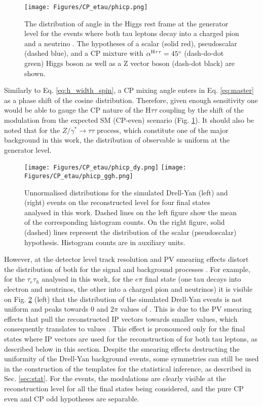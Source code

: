 \begin{figure}[t!]
    \centering
    \texttt{[image: Figures/CP\_etau/phicp.png]}
    \caption{The distribution of \phicp angle in the Higgs rest frame at the generator level for the \htt events where both tau leptons decay into a charged pion and a neutrino \cite{CMS:2021sdq}. The hypotheses of a scalar (solid red), pseudoscalar (dashed blue), and a CP mixture with $\alpha^{\text{H}\tau\tau}=45^\circ$ (dash-do-dot green) Higgs boson as well as a Z vector boson (dash-dot black) are shown.}
    \label{fig:phicp}
\end{figure}

Similarly to Eq. \ref{eq:h_width_spin}, a CP mixing angle \mixa enters in Eq. \ref{eq:master} as a phase shift of the cosine distribution. Therefore, given enough sensitivity one would be able to gauge the CP nature of the $\text{H}\tau\tau$ coupling by the shift of the modulation from the expected SM (CP-even) scenario (Fig. \ref{fig:phicp}). It should also be noted that for the $Z/\gamma^* \to \tau\tau$ process, which constitute one of the major background in this work, the distribution of \phicp observable is uniform at the generator level. 

\begin{figure}[t!]
    \centering
    \texttt{[image: Figures/CP\_etau/phicp\_dy.png]}
    \texttt{[image: Figures/CP\_etau/phicp\_ggh.png]}
    \caption{Unnormalised \phicp distributions for the simulated Drell-Yan (left) and \htt (right) events on the reconstructed level for four final states analysed in this work. Dashed lines on the left figure show the mean of the corresponding histogram counts. On the right figure, solid (dashed) lines represent the distribution of the scalar (pseudoscalar) \htt hypothesis. Histogram counts are in auxiliary units.}
    \label{fig:phicp_e}
\end{figure}

However, at the detector level track resolution and PV smearing effects distort the distribution of \phicp both for the signal and background processes \cite{Berge:2014sra}. For example, for the $\tau_e\tau_h$ analysed in this work, for the $e\pi$ final state (one tau decays into electron and neutrinos, the other into a charged pion and neutrinos) it is visible on Fig. \ref{fig:phicp_e} (left) that the distribution of the simulated Drell-Yan events is not uniform and peaks towards $0$ and $2\pi$ values of \phicp. This is due to the PV smearing effects that pull the reconstructed IP vectors towards smaller values, which consequently translates to \phicp values . This effect is pronounced only for the final states where IP vectors are used for the reconstruction of \phicp for both tau leptons, as described below in this section. Despite the smearing effects destructing the uniformity of the Drell-Yan background events, some symmetries can still be used in the construction of the templates for the statistical inference, as described in Sec. \ref{sec:stat}. For the \htt events, the modulations are clearly visible at the reconstruction level for all the final states being considered, and the pure CP even and CP odd hypotheses are separable. 

